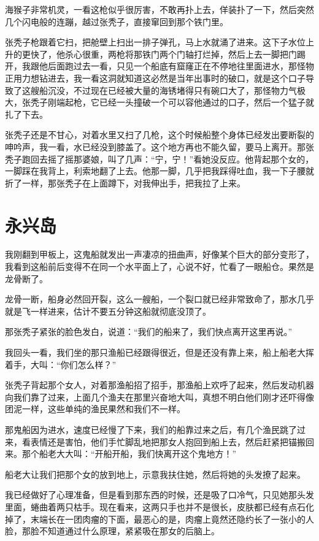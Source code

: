 海猴子非常机灵，一看这枪似乎很厉害，不敢再扑上去，佯装扑了一下，然后突然几个闪电般的连蹦，越过张秃子，直接窜回到那个铁门里。

张秃子枪跟着它扫，把舱壁上扫出一排子弹孔，马上水就涌了进来。这下子水位上升的更快了，他杀心很重，两枪将那铁门两个门轴打烂掉，然后上去一脚把门踢开，我跟他后面跑过去一看，只见一个船底有窟窿正在不停地往里面进水，那怪物正用力想钻进去，我一看这洞就知道这必然是当年出事时的破口，就是这个口子导致了这艘船沉没，不过现在已经被大量的海锈堵得只有碗口大了，那怪物力气极大，张秃子刚端起枪，它已经一头撞破一个可以容他通过的口子，然后一个猛子就扎了下去。

张秃子还是不甘心，对着水里又扫了几枪，这个时候船整个身体已经发出要断裂的呻吟声，我一看，水已经没到膝盖了。这个地方再也不能久留，要马上离开。那张秃子跑回去摇了摇那婆娘，叫了几声：“宁，宁！”看她没反应。他背起那个女的，一脚踩在我背上，利索地翻了上去。他那一脚，几乎把我踩得吐血，我一下子腰就折了一样，那张秃子在上面蹲下，对我伸出手，把我拉了上来。

\chapter{永兴岛}

我刚翻到甲板上，这鬼船就发出一声凄凉的扭曲声，好像某个巨大的部分变形了，我看到这船前后变得不在同一个水平面上了，心说不好，忙看了一眼船仓。果然是龙骨断了。

龙骨一断，船身必然回开裂，这么一艘船，一个裂口就已经非常致命了，那水几乎就是飞一样进来，估计不要五分钟这船就彻底没顶了。

那张秃子紧张的脸色发白，说道：“我们的船来了，我们快点离开这里再说。”

我回头一看，我们坐的那只渔船已经跟得很近，但是还没有靠上来，船上船老大挥着手，大叫：“你们怎么样？”

张秃子背起那个女人，对着那渔船招了招手，那渔船上欢呼了起来，然后发动机器向我们靠了过来，上面几个渔夫在那里兴奋地大叫，真想不明白他们刚才还吓得像团泥一样，这些单纯的渔民果然和我们不一样。

那鬼船因为进水，速度已经慢了下来，我们的船靠过来之后，有几个渔民跳了过来，看表情还是害怕，他们手忙脚乱地把那女人抱回到船上去，然后赶紧把锚搬回来。那个船老大大叫：“开船开船，我们快离开这个鬼地方！”

船老大让我们把那个女的放到地上，示意我扶住她，然后将她的头发撩了起来。

我已经做好了心理准备，但是看到那东西的时候，还是吸了口冷气，只见她那头发里面，蜷曲着两只枯手。现在看来，这两只手也并不是很长，皮肤都已经有点石化掉了，末端长在一团肉瘤的下面，最恶心的是，肉瘤上竟然还隐约长了一张小的人脸，那脸不知道通过什么原理，紧紧吸在那女的后脑上。

